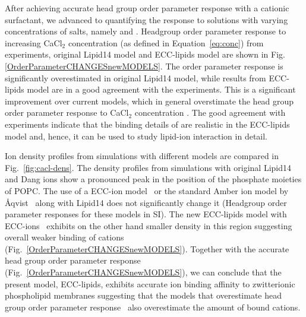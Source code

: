 \documentclass[aip,jcp,twocolumn]{revtex4}
\begin{document}
After achieving accurate head group order parameter response with a cationic surfactant, 
we advanced to quantifying the response to solutions with varying concentrations of salts, namely  and . 
Headgroup order parameter response to increasing CaCl$_2$ concentration
(as defined in Equation~\ref{eq:conc})
from experiments, original Lipid14 model and ECC-lipids model are shown
in Fig. \ref{OrderParameterCHANGESnewMODELS}. The order parameter response
is significantly overestimated in original Lipid14 model, while results from
ECC-lipids model are in a good agreement with the experiments.
This is a significant improvement over current models,
which in general overstimate the head group order parameter response to CaCl$_2$
concentration \cite{catte16}. The good agreement with experiments indicate
that the binding details of  are realistic in the ECC-lipids model
and, hence, it can be used to study lipid-ion interaction in detail.

Ion density profiles from simulations with different models are compared in Fig.~\ref{fig:cacl-dens}.
The density profiles from simulations with original Lipid14 \cite{dickson14} and Dang ions \cite{smith94,chang1999,dang2006} 
show a pronounced peak in the position of the phosphate moieties of POPC. 
The use of a ECC-ion model~\cite{Jungwirth2017,Jungwirth2015,kohagen14,kohagen16}
or the standard Amber ion model by \AA{qvist}~\cite{aqvist90}
along with Lipid14 does not significantly change it 
(Headgroup order parameter responses for these models in SI).
The new ECC-lipids model with ECC-ions~\cite{Jungwirth2017,Jungwirth2015,kohagen14,kohagen16} exhibits on the other hand smaller density in this region 
suggesting overall weaker binding of cations (Fig.~\ref{OrderParameterCHANGESnewMODELS}). 
Together with the accurate head group order parameter response (Fig.~\ref{OrderParameterCHANGESnewMODELS}),
we can conclude that the present model, ECC-lipids, exhibits accurate ion binding affinity to zwitterionic phospholipid membranes
suggesting that the models that overestimate head group order parameter response~\cite{catte16} also overestimate the amount of bound cations.
\end{document}

